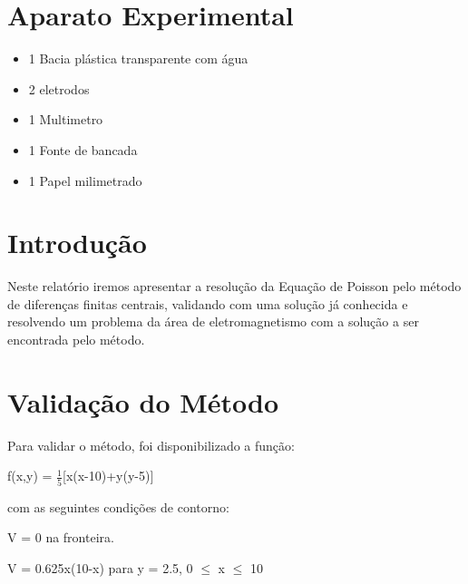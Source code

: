 \documentclass[
12pt,				%
oneside,			%
a4paper,			%
english,			%
french,				%
spanish,			%
brazil				%
]{abntex2}
\begin{document}


\tableofcontents*
\cleardoublepage
{}	%



\textual


\chapter{Aparato Experimental}
\begin{itemize}
\large
\item 1 Bacia plástica transparente com água

\item 2 eletrodos

\item 1 Multimetro

\item 1 Fonte de bancada

\item 1 Papel milimetrado

\end{itemize}
\normalsize
\chapter{Introdução}

Neste relatório iremos apresentar a resolução da Equação de Poisson pelo método de diferenças finitas centrais, validando com uma solução já conhecida e resolvendo um problema da área de eletromagnetismo com a solução a ser encontrada pelo método.

\chapter{Validação do Método}

Para validar o método, foi disponibilizado a função:

\begin{center}f(x,y) = $\frac{1}{5}$[x(x-10)+y(y-5)]\end{center}

com as seguintes condições de contorno:
\begin{center}
V = 0 na fronteira. 

V = 0.625x(10-x) para  y = 2.5,  0 $\leq $ x $\leq $  10 
\end{center}
\end{document}
